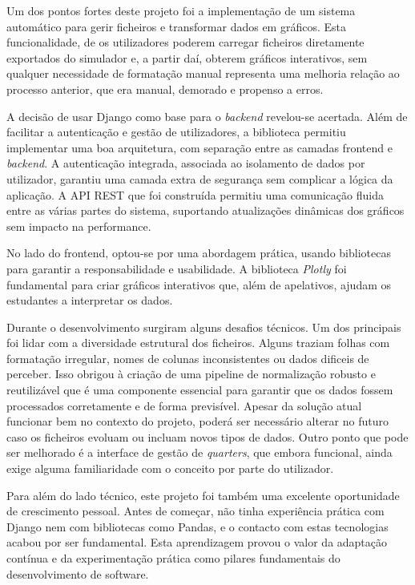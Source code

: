 Um dos pontos fortes deste projeto foi a implementação de um sistema automático para gerir ficheiros e transformar dados em gráficos. Esta funcionalidade, de os utilizadores poderem carregar ficheiros diretamente exportados do simulador e, a partir daí, obterem gráficos interativos, sem qualquer necessidade de formatação manual representa uma melhoria relação ao processo anterior, que era manual, demorado e propenso a erros. 

A decisão de usar Django como base para o \textit{backend} revelou-se acertada. Além de facilitar a autenticação e gestão de utilizadores, a  biblioteca permitiu implementar uma boa arquitetura, com separação entre as camadas frontend e \textit{backend}. A autenticação integrada, associada ao isolamento de dados por utilizador, garantiu uma camada extra de segurança sem complicar a lógica da aplicação. A API REST que foi construída permitiu uma comunicação fluida entre as várias partes do sistema, suportando atualizações dinâmicas dos gráficos sem impacto na performance.

No lado do frontend, optou-se por uma abordagem prática, usando bibliotecas para garantir a responsabilidade e usabilidade. A biblioteca \textit{Plotly} foi fundamental para criar gráficos interativos que, além de apelativos, ajudam os estudantes a interpretar os dados.

Durante o desenvolvimento surgiram alguns desafios técnicos. Um dos principais foi lidar com a diversidade estrutural dos ficheiros. Alguns traziam folhas com formatação irregular, nomes de colunas inconsistentes ou dados dificeis de perceber. Isso obrigou à criação de uma pipeline de normalização robusto e reutilizável que é uma componente essencial para garantir que os dados fossem processados corretamente e de forma previsível. Apesar da solução atual funcionar bem no contexto do projeto, poderá ser necessário alterar no futuro caso os ficheiros evoluam ou incluam novos tipos de dados. Outro ponto que pode ser melhorado é a interface de gestão de \textit{quarters}, que embora funcional, ainda exige alguma familiaridade com o conceito por parte do utilizador.

Para além do lado técnico, este projeto foi também uma excelente oportunidade de crescimento pessoal. Antes de começar, não tinha experiência prática com Django nem com bibliotecas como Pandas, e o contacto com estas tecnologias acabou por ser fundamental. Esta aprendizagem provou o valor da adaptação contínua e da experimentação prática como pilares fundamentais do desenvolvimento de software.

